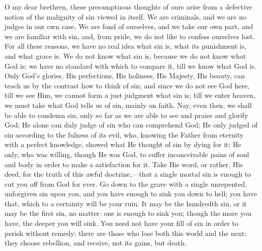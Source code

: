 O my dear brethren, these presumptuous thoughts of ours arise from
a defective notion of the malignity of sin viewed in itself. We are
criminals, and we are no judges in our own case. We are fond of
ourselves, and we take our own part, and we are familiar with sin,
and, from pride, we do not like to confess ourselves lost. For all
these reasons, we have no real idea what sin is, what its punishment
is, and what grace is. We do not know what sin is, because we do not
know what God is; we have no standard with which to compare it, till
we know what God is. Only God's glories, His perfections, His
holiness, His Majesty, His beauty, can teach us by the contrast how to
think of sin; and since we do not see God here, till we see Him, we
cannot form a just judgment what sin is; till we enter heaven, we must
take what God tells us of sin, mainly on faith. Nay, even then, we
shall be able to condemn sin, only so far as we are able to see and
praise and glorify God; He alone can duly judge of sin who can
comprehend God; He only judged of sin according to the fulness of its
evil, who, knowing the Father from eternity with a perfect knowledge,
showed what He thought of sin by dying for it; He only, who was
willing, though He was God, to suffer inconceivable pains of soul and
body in order to make a satisfaction for it. Take His word, or rather,
His deed, for the truth of this awful doctrine,—that a single mortal
sin is enough to cut you off from God for ever. Go down to the grave
with a single unrepented, unforgiven sin upon you, and you have enough
to sink you down to hell; you have that, which to a certainty will be
your ruin. It may be the hundredth sin, or it may be the first sin, no
matter: one is enough to sink you; though the more you have, the
deeper you will sink. You need not have your fill of sin in order to
perish without remedy; there are those who lose both this world and
the next; they choose rebellion, and receive, not its gains, but
death.

